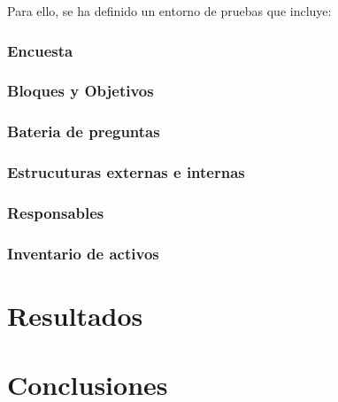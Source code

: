 \documentclass[a4paper, 10pt]{article}
\begin{document}
Para ello, se ha definido un entorno de pruebas que incluye:

\par\vspace{0.4cm}

\subsubsection*{Encuesta}

\subsubsection*{Bloques y Objetivos}
\subsubsection*{Bateria de preguntas}
\subsubsection*{Estrucuturas externas e internas}
\subsubsection*{Responsables}

\subsubsection*{Inventario de activos}




\clearpage

\section{Resultados}



\clearpage

\section{Conclusiones}



\clearpage
\end{document}
